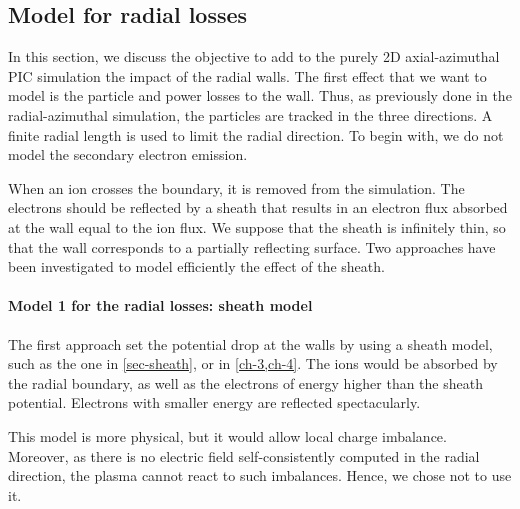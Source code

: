 \subsection{Model for radial losses} \label{subsec-fakeR}

In this section, we discuss the objective to add to the purely \ac{2D} axial-azimuthal \ac{PIC} simulation the impact of the radial walls.
The first effect that we want to model is the particle and power losses to the wall.
Thus, as previously done in the radial-azimuthal simulation, the particles are tracked in the three directions.
A finite radial length is used to limit the radial direction.
To begin with, we do not model the secondary electron emission.

When an ion crosses the boundary, it is removed from the simulation.
The electrons should be reflected by a sheath that results in an electron flux absorbed at the wall equal to the ion flux.
We suppose that the sheath is infinitely thin, so that the wall corresponds to a partially reflecting surface.
Two approaches have been investigated to model efficiently the effect of the sheath.


\paragraph{ Model 1 for the radial losses\string: sheath model\\}
The first approach set the potential drop at the walls by using  a sheath model, such as the one in \cref{sec-sheath}, or in \cref{ch-3,ch-4}.
The ions would be absorbed by the radial boundary, as well as the electrons of energy higher than the sheath potential.
Electrons with smaller energy are reflected spectacularly.

This model is more physical, but it would allow local charge imbalance.
Moreover, as there is no electric field self-consistently computed in the radial direction, the plasma cannot react to such imbalances.
Hence, we chose not to use it.

